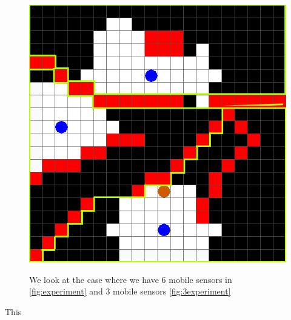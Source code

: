 \begin{figure}
{\includegraphics[scale=0.18]{figs/SGR-grid-vis-part_3.png}
\hspace{.3cm}}

\caption{We look at the case where we have 6 mobile sensors in \ref{fig:experiment} and 3 mobile sensors \ref{fig:3experiment}\label{fig:bigexp}}
\end{figure} 

This 